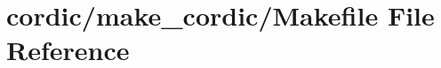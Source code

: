 \hypertarget{cordic_2make__cordic_2Makefile}{\section{cordic/make\-\_\-cordic/\-Makefile File Reference}
\label{cordic_2make__cordic_2Makefile}
}
